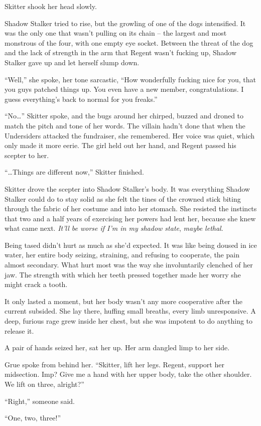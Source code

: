Skitter shook her head slowly.



Shadow Stalker tried to rise, but the growling of one of the dogs intensified.  It was the only one that wasn't pulling on its chain – the largest and most monstrous of the four, with one empty eye socket.  Between the threat of the dog and the lack of strength in the arm that Regent wasn't fucking up, Shadow Stalker gave up and let herself slump down.



``Well,'' she spoke, her tone sarcastic, ``How wonderfully fucking nice for you, that you guys patched things up.  You even have a new member, congratulations.  I guess everything's back to normal for you freaks.''



``No\ldots''  Skitter spoke, and the bugs around her chirped, buzzed and droned to match the pitch and tone of her words.  The villain hadn't done that when the Undersiders attacked the fundraiser, she remembered.   Her voice was quiet, which only made it more eerie.  The girl held out her hand, and Regent passed his scepter to her.



``\ldots{}Things are different now,'' Skitter finished.



Skitter drove the scepter into Shadow Stalker's body.  It was everything Shadow Stalker could do to stay solid as she felt the tines of the crowned stick biting through the fabric of her costume and into her stomach.  She resisted the instincts that two and a half years of exercising her powers had lent her, because she knew what came next.  \emph{It'll be worse if I'm in my shadow state}, \emph{maybe lethal}.



Being tased didn't hurt as much as she'd expected.  It was like being doused in ice water, her entire body seizing, straining, and refusing to cooperate, the pain almost secondary.  What hurt most was the way she involuntarily clenched of her jaw.  The strength with which her teeth pressed together made her worry she might crack a tooth.



It only lasted a moment, but her body wasn't any more cooperative after the current subsided.  She lay there, huffing small breaths, every limb unresponsive.  A deep, furious rage grew inside her chest, but she was impotent to do anything to release it.



A pair of hands seized her, sat her up.  Her arm dangled limp to her side.



Grue spoke from behind her.  ``Skitter, lift her legs.  Regent, support her midsection.  Imp?  Give me a hand with her upper body, take the other shoulder.  We lift on three, alright?''



``Right,'' someone said.



``One, two, three!''






